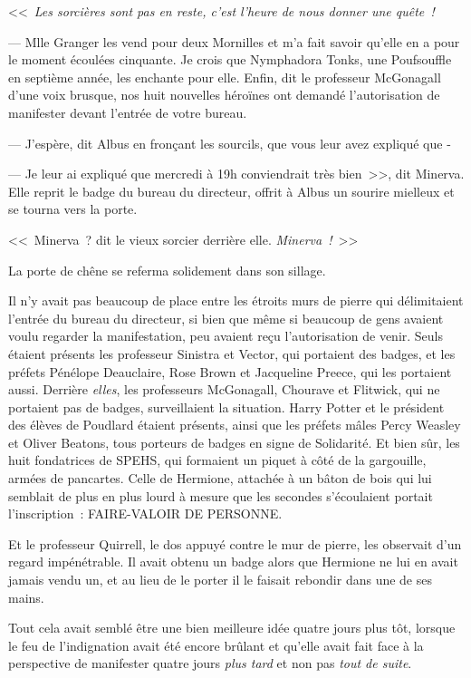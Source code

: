 <<~\emph{Les sorcières sont pas en reste, c'est l'heure de nous donner une quête~!}

--- Mlle Granger les vend pour deux Mornilles et m'a fait savoir qu'elle en a pour le moment écoulées cinquante. Je crois que Nymphadora Tonks, une Poufsouffle en septième année, les enchante pour elle. Enfin, dit le professeur McGonagall d'une voix brusque, nos huit nouvelles héroïnes ont demandé l'autorisation de manifester devant l'entrée de votre bureau.

--- J'espère, dit Albus en fronçant les sourcils, que vous leur avez expliqué que -

--- Je leur ai expliqué que mercredi à 19h conviendrait très bien~>>, dit Minerva. Elle reprit le badge du bureau du directeur, offrit à Albus un sourire mielleux et se tourna vers la porte.

<<~Minerva~? dit le vieux sorcier derrière elle. \emph{Minerva~!}~>>

La porte de chêne se referma solidement dans son sillage.

\later

Il n'y avait pas beaucoup de place entre les étroits murs de pierre qui délimitaient l'entrée du bureau du directeur, si bien que même si beaucoup de gens avaient voulu regarder la manifestation, peu avaient reçu l'autorisation de venir. Seuls étaient présents les professeur Sinistra et Vector, qui portaient des badges, et les préfets Pénélope Deauclaire, Rose Brown et Jacqueline Preece, qui les portaient aussi. Derrière \emph{elles}, les professeurs McGonagall, Chourave et Flitwick, qui ne portaient pas de badges, surveillaient la situation. Harry Potter et le président des élèves de Poudlard étaient présents, ainsi que les préfets mâles Percy Weasley et Oliver Beatons, tous porteurs de badges en signe de Solidarité. Et bien sûr, les huit fondatrices de SPEHS, qui formaient un piquet à côté de la gargouille, armées de pancartes. Celle de Hermione, attachée à un bâton de bois qui lui semblait de plus en plus lourd à mesure que les secondes s'écoulaient portait l'inscription~: FAIRE-VALOIR DE PERSONNE.

Et le professeur Quirrell, le dos appuyé contre le mur de pierre, les observait d'un regard impénétrable. Il avait obtenu un badge alors que Hermione ne lui en avait jamais vendu un, et au lieu de le porter il le faisait rebondir dans une de ses mains.

Tout cela avait semblé être une bien meilleure idée quatre jours plus tôt, lorsque le feu de l'indignation avait été encore brûlant et qu'elle avait fait face à la perspective de manifester quatre jours \emph{plus tard} et non pas \emph{tout de suite}.

